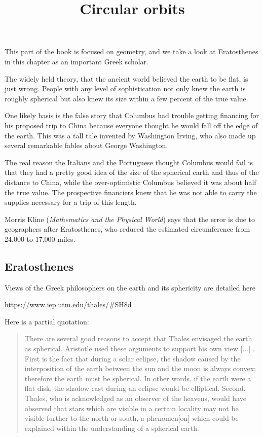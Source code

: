 \documentclass[11pt, oneside]{article}
\title{Circular orbits}
\date{}
\begin{document}
\maketitle
\Large


This part of the book is focused on geometry, and we take a look at Eratosthenes in this chapter as an important Greek scholar.

The widely held theory, that the ancient world believed the earth to be flat, is just wrong.  People with any level of sophistication not only knew the earth is roughly spherical but also knew its size within a few percent of the true value.

One likely basis is the false story that Columbus had trouble getting financing for his proposed trip to China because everyone thought he would fall off the edge of the earth.  This was a tall tale invented by Washington Irving, who also made up several remarkable fables about George Washington.

The real reason the Italians and the Portuguese thought Columbus would fail is that they had a pretty good idea of the size of the spherical earth and thus of the distance to China, while the over-optimistic Columbus believed it was about half the true value.  The prospective financiers knew that he was not able to carry the supplies necessary for a trip of this length.

Morris Kline (\emph{Mathematics and the Physical World}) says that the error is due to geographers after Eratosthenes, who reduced the estimated circumference from 24,000 to 17,000 miles.

\subsection*{Eratosthenes}

Views of the Greek philosophers on the earth and its sphericity are detailed here

\url{https://www.iep.utm.edu/thales/#SH8d}

Here is a partial quotation:

\begin{quote}
There are several good reasons to accept that Thales envisaged the earth as spherical. Aristotle used these arguments to support his own view [...] . First is the fact that during a solar eclipse, the shadow caused by the interposition of the earth between the sun and the moon is always convex; therefore the earth must be spherical. In other words, if the earth were a flat disk, the shadow cast during an eclipse would be elliptical. Second, Thales, who is acknowledged as an observer of the heavens, would have observed that stars which are visible in a certain locality may not be visible further to the north or south, a phenomen[on] which could be explained within the understanding of a spherical earth.
\end{quote}
\end{document}
